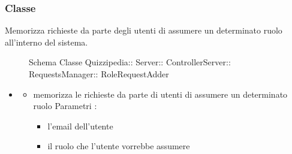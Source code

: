 \subsubsection{Classe }
Memorizza richieste da parte degli utenti di assumere un determinato ruolo all'interno del sistema.
\begin{figure}[H]
\centering
\noindent{}
\caption[Schema Classe RoleRequestAdder]{Schema Classe Quizzipedia:: Server:: ControllerServer:: RequestsManager:: RoleRequestAdder}
\end{figure}
\begin{itemize}
\item {}
\begin{itemize}
\item {}
\newline
memorizza le richieste da parte di utenti di assumere un determinato ruolo
\newline
Parametri :
\begin{itemize}
\item {}
\newline
l'email dell'utente
\item {}
\newline
il ruolo che l'utente vorrebbe assumere
\end{itemize}
\end{itemize}
\end{itemize}
